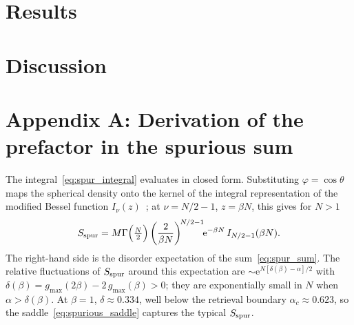 \documentclass[letterpaper]{article} %
\newcommand{\e}{{\mathrm{e}}}
\newcommand{\Bnet}{\beta}
\begin{document}
\section{Results}


\section{Discussion}









\appendix

\section{Appendix A: Derivation of the prefactor in the spurious sum}

The integral~\eqref{eq:spur_integral} evaluates in closed form. Substituting
$\varphi = \cos\theta$ maps the spherical density onto the kernel of the integral
representation of the modified Bessel function
$I_\nu(z)$~\citep[8.431.3]{gradshteyn2015}; at $\nu = N/2 - 1$, $z = \Bnet N$,
this gives for $N > 1$
\begin{equation}
S_{\rm spur} = M \Gamma\Big(\tfrac{N}{2}\Big)\left(\frac{2}{\Bnet N}\right)^{\!N/2-1}\!\!\e^{-\Bnet N}\,I_{N/2-1}(\Bnet N).
\label{eq:spurious_exact}
\end{equation}
The right-hand side is the disorder expectation of the sum~\eqref{eq:spur_sum}. The
relative fluctuations of $S_{\rm spur}$ around this expectation are
$\sim \e^{N[\delta(\Bnet) - \alpha]/2}$ with
$\delta(\Bnet) = g_{\max}(2\Bnet) - 2\,g_{\max}(\Bnet) > 0$; they are exponentially
small in $N$ when $\alpha > \delta(\Bnet)$. At $\Bnet = 1$, $\delta \approx 0.334$,
well below the retrieval boundary $\alpha_c \approx 0.623$, so the
saddle~\eqref{eq:spurious_saddle} captures the typical $S_{\rm spur}$.
\end{document}
